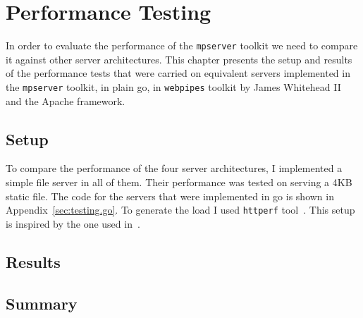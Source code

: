 \section{Performance Testing}
\label{sec:test}
In order to evaluate the performance of the \texttt{mpserver} toolkit we 
need to compare it against other server architectures.
This chapter presents the setup and results of the performance tests
that were carried on equivalent servers implemented in the \texttt{mpserver} toolkit,
in plain go, in \texttt{webpipes} toolkit by James Whitehead II~\cite{whitehead} 
and the Apache framework.

\subsection{Setup}
To compare the performance of the four server architectures, I 
implemented a simple file server in all of them. Their performance 
was tested on serving a 4KB static file. The code for the servers 
that were implemented in go is shown in Appendix~\ref{sec:testing.go}. To generate 
the load I used \texttt{httperf} tool~\cite{httperf}. This setup
is inspired by the one used in~\cite{whitehead}.


\subsection{Results}

\subsection{Summary}

